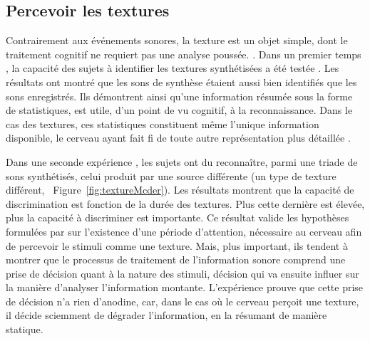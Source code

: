 \subsection{Percevoir les textures}

Contrairement aux événements sonores, la texture est un objet simple, dont le traitement cognitif ne requiert pas une analyse poussée.    . 
Dans un premier temps  \citep{mcdermott2011sound}, la capacité des sujets à identifier les textures synthétisées a été testée . Les résultats ont montré que les sons de synthèse étaient aussi bien identifiés que les sons enregistrés. Ils démontrent  ainsi qu'une information résumée sous la forme de statistiques, est utile, d'un point de vu cognitif, à la reconnaissance. Dans le cas des textures, ces statistiques constituent même l'unique information disponible, le cerveau ayant fait fi de toute autre représentation plus détaillée \citep{nelken2013ear}.

Dans une seconde expérience \citep{mcdermott2013summary}, les sujets ont du reconnaître, parmi une triade de sons synthétisés, celui produit par une source différente (\ie un type de texture différent, \Cf~Figure~\ref{fig:textureMcder}). Les résultats montrent que la capacité de discrimination est fonction de la durée des textures. Plus cette dernière est élevée, plus la capacité à discriminer est importante. Ce résultat valide les hypothèses formulées par \citep{saint1995classification} sur l'existence d'une période d'attention, nécessaire au cerveau afin de percevoir le stimuli comme une texture. Mais, plus important, ils tendent à montrer  que le processus de traitement de l'information sonore comprend une prise de décision quant à la nature des stimuli, décision qui va  ensuite influer sur la manière d'analyser l'information montante. L'expérience prouve que cette prise de décision n'a rien d'anodine, car, dans le cas où le cerveau perçoit une texture, il décide sciemment de dégrader l'information, en la résumant de manière statique.

